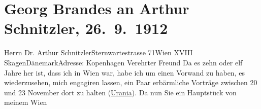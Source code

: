 

         
         \renewcommand{\erwaehntePersonen}{Personen: Richard Beer-Hofmann, Hugo von Hofmannsthal, Jakob Wassermann}
         \renewcommand{\erwaehnteOrte}{Orte: Dänemark, Kopenhagen, Skagen, Sternwartestraße, Urania, Wien, XVIII., Währing}
         \renewcommand{\erwaehnteWerke}{}
               \section[Georg Brandes an Arthur Schnitzler, 26. 9. 1912]{ Georg Brandes an Arthur Schnitzler, 26. 9. 1912}\nopagebreak{}\rehead{ }\begin{ledgroupsized}[t]{13cm}\normalsize\beginnumbering \toendnotes[C]{\smallbreak\pagebreak[2]} 
\toendnotes[C]{\smallbreak}\pstart{}{\pb}Herrn Dr. Arthur
                  Schnitzler\pend{}\pstart{}Sternwartestrasse 71\pend{}\pstart{}Wien XVIII\pend{}{\bigskip}\pstart
           \raggedleft{}{\pb}\label{K_L02091_1v}\label{K_L02091_1h}{ }SkagenDänemarkAdresse: Kopenhagen\pend
           \pstart{}Verehrter Freund\pend\pstart
           Da es zehn oder elf Jahre her ist, dass ich in Wien war, habe ich um einen Vorwand zu haben, es wiederzusehen, mich
               engagiren lassen, ein Paar erbärmliche Vorträge zwischen 20{ }\strikeout{\textcolor{gray}{×}} und 23 November dort zu halten (\uline{Urania}). Da nun Sie ein Hauptstück von meinem Wien

\end{ledgroupsized}
